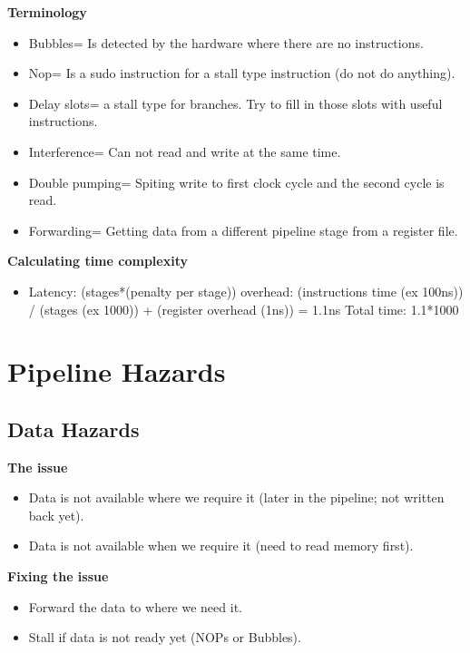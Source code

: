 \textbf{Terminology}
\begin{itemize}
\item  Bubbles= Is detected by the hardware where there are no instructions.
\item  Nop= Is a sudo instruction for a stall type instruction (do not do anything).
\item  Delay slots= a stall type for branches. Try to fill in those slots with useful instructions.
\item  Interference= Can not read and write at the same time.
\item  Double pumping= Spiting write to first clock cycle and the second cycle is read.
\item  Forwarding= Getting data from a different pipeline stage from a register file.
\end{itemize}


\textbf{Calculating time complexity}
\begin{itemize}
\item  Latency: (stages*(penalty per stage)) \newline
  overhead: (instructions time (ex 100ns)) / (stages (ex 1000)) + (register overhead (1ns)) = 1.1ns
  Total time: 1.1*1000
\end{itemize}



\section{Pipeline Hazards}

\subsection{Data Hazards}
\textbf{The issue}
\begin{itemize}
\item  Data is not available where we require it (later in the pipeline; not written back yet).
\item  Data is not available when we require it (need to read memory first).
\end{itemize}

\noindent\textbf{Fixing the issue}
\begin{itemize}
\item  Forward the data to where we need it.
\item  Stall if data is not ready yet (NOPs or Bubbles).
\end{itemize}

